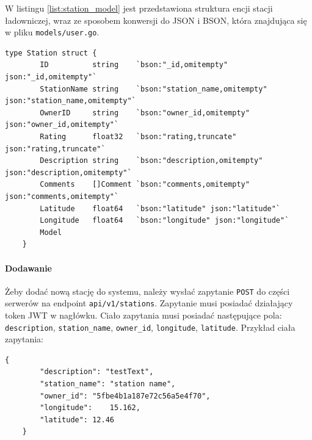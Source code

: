 W listingu \ref{list:station_model} jest przedstawiona struktura encji stacji ładowniczej, wraz ze sposobem konwersji do JSON i BSON, która znajdująca się w pliku \texttt{models/user.go}.
\begin{lstlisting}[label=list:station_model,caption=Model danych stacji ładowniczej,basicstyle=\tiny\ttfamily]
    type Station struct {
        ID          string    `bson:"_id,omitempty" json:"_id,omitempty"`
        StationName string    `bson:"station_name,omitempty" json:"station_name,omitempty"`
        OwnerID     string    `bson:"owner_id,omitempty" json:"owner_id,omitempty"`
        Rating      float32   `bson:"rating,truncate" json:"rating,truncate"`
        Description string    `bson:"description,omitempty" json:"description,omitempty"`
        Comments    []Comment `bson:"comments,omitempty" json:"comments,omitempty"`
        Latitude    float64   `bson:"latitude" json:"latitude"`
        Longitude   float64   `bson:"longitude" json:"longitude"`
        Model
    }
\end{lstlisting}

\paragraph{Dodawanie\newline}
Żeby dodać nową stację do systemu, należy wysłać zapytanie \texttt{POST} do części serwerów na endpoint \texttt{api/v1/stations}. Zapytanie musi posiadać działający token JWT w nagłówku. Ciało zapytania musi posiadać następujące pola: \texttt{description}, \texttt{station\_name}, \texttt{owner\_id}, \texttt{longitude}, \texttt{latitude}.
Przykład ciała zapytania:
\begin{lstlisting}[basicstyle=\tiny\ttfamily]
    {
		"description": "testText",
		"station_name": "station name",
		"owner_id": "5fbe4b1a187e72c56a5e4f70",
		"longitude":    15.162,
		"latitude": 12.46
    }
\end{lstlisting}

